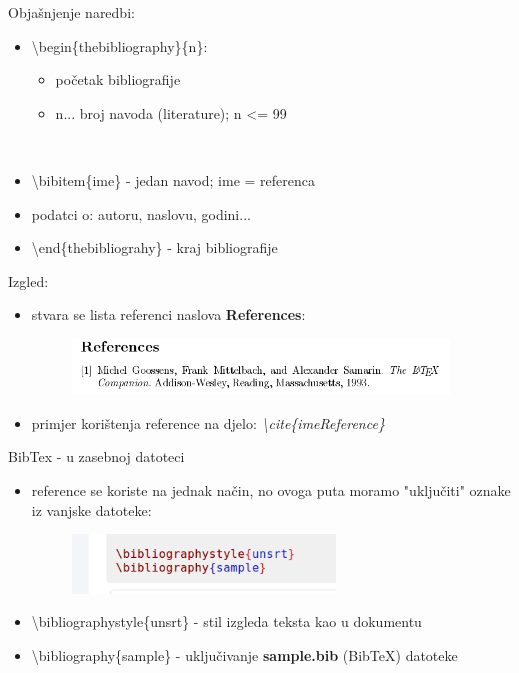 \documentclass{beamer}
\begin{document}
\begin{frame}
Objašnjenje naredbi:
\begin{itemize}
    \item \textbackslash begin\{thebibliography\}\{n\}:
        \begin{itemize}
            \item početak bibliografije \\
            \item n... broj navoda (literature); n \textless= 99 \\
        \end{itemize} \\
    \item \textbackslash bibitem\{ime\} - jedan navod; ime = referenca \\
    \item podatci o: autoru, naslovu, godini... \\
    \item \textbackslash end\{thebibliograhy\} - kraj bibliografije
\end{itemize}
Izgled:
\begin{itemize}
    \item stvara se lista referenci naslova \textbf{References}: 
    \begin{figure}
    \includegraphics[width=10cm]{bibtexUDokumentu2.png}
    \end{figure}
    \item primjer korištenja reference na djelo: \textit{\textbackslash cite\{imeReference\}} \\
\end{itemize}
\end{frame}

\begin{frame}{BibTex - u zasebnoj datoteci}
\begin{itemize}
    \item reference se koriste na jednak način, no ovoga puta moramo "uključiti" oznake iz vanjske datoteke: \\
    \begin{figure}
    \includegraphics[width=7cm]{bibtexZaseban.png}
    \end{figure}
    \item \textbackslash bibliographystyle\{unsrt\} - stil izgleda teksta kao u dokumentu \\
    \item \textbackslash bibliography\{sample\} - uključivanje \textbf{sample.bib} (BibTeX) datoteke \\
\end{itemize}    
\end{frame}
\end{document}
